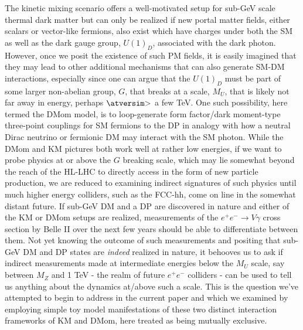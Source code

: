 \documentclass[14pt]{article}
\def\to{\rightarrow}
\def\matth{\mathsurround=0pt}
\def\gsim{\mathrel{\mathpalette\atversim>}}
\def\atversim#1#2{\lower0.7ex\vbox{\baselineskip\zatskip\lineskip\zatskip
  \lineskiplimit 0pt\ialign{$\matth#1\hfil##\hfil$\crcr#2\crcr\sim\crcr}}}
\begin{document}
{The kinetic mixing scenario offers a well-motivated setup for sub-GeV scale thermal dark matter but can only be realized if new portal matter fields, either scalars or vector-like fermions, also exist 
which have charges under both the SM as well as the dark gauge group, $U(1)_D$, associated with the dark photon. However, once we posit the existence of such PM fields, it is easily imagined that 
they may lead to other additional mechanisms that can also generate SM-DM interactions, especially since one can argue that the $U(1)_D$ must be part of some larger non-abelian group, $G$, 
that breaks at a scale, $M_U$, that is likely not far away in energy, perhaps $\gsim$ a few TeV. One such possibility, here termed the DMom model, is to loop-generate form factor/dark moment-type 
three-point couplings for SM fermions to the DP in analogy with how a neutral Dirac neutrino or fermionic DM may interact with the SM photon. While the DMom and KM pictures both work well at 
rather low energies, if we want to probe physics at or above 
the $G$ breaking scale, which may lie somewhat beyond the reach of the HL-LHC to directly access in the form of new particle production, we are reduced to examining indirect signatures of such 
physics until much higher energy colliders, such as the FCC-hh, come on line in the somewhat distant future. If sub-GeV DM and a DP are discovered in nature and either of the KM or DMom setups 
are realized, measurements of the $e^+e^-\to V\gamma$ cross section by Belle II over the next few years should be able to differentiate between them. Not yet knowing the outcome of such 
measurements and positing that sub-GeV DM and DP states are {\it indeed} realized in nature, it behooves us to ask if indirect measurements made at intermediate energies below the $M_U$ scale, 
say between $M_Z$ and 1 TeV - the realm of future $e^+e^-$ colliders - can be used to tell us anything about the dynamics at/above such a scale. This is the question we've attempted to begin to address 
in the current paper and which we examined by employing simple toy model manifestations of these two distinct interaction frameworks of KM and DMom, here treated as being mutually exclusive.

}
\end{document}
